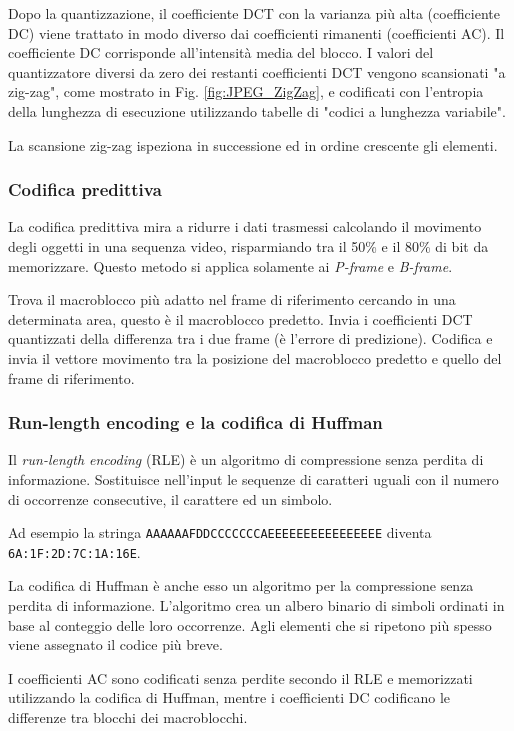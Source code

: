 Dopo la quantizzazione, il coefficiente DCT con la varianza più alta (coefficiente DC) viene trattato in modo diverso dai coefficienti rimanenti (coefficienti AC). Il coefficiente DC corrisponde all'intensità media del blocco. I valori del quantizzatore diversi da zero dei restanti coefficienti DCT vengono scansionati "a zig-zag", come mostrato in Fig. \ref{fig:JPEG_ZigZag}, e codificati con l'entropia della lunghezza di esecuzione utilizzando tabelle di "codici a lunghezza variabile".

La scansione zig-zag ispeziona in successione ed in ordine crescente gli elementi.



\subsubsection{Codifica predittiva}
La codifica predittiva mira a ridurre i dati trasmessi calcolando il movimento degli oggetti in una sequenza video, risparmiando tra il 50\% e il 80\% di bit da memorizzare. Questo metodo si applica solamente ai \textit{P-frame} e \textit{B-frame}.

Trova il macroblocco più adatto nel frame di riferimento cercando in una determinata area, questo è il macroblocco predetto.
Invia i coefficienti DCT quantizzati della differenza tra i due frame (è l'errore di predizione).
Codifica e invia il vettore movimento tra la posizione del macroblocco predetto e quello del frame di riferimento.



\subsubsection{Run-length encoding e la codifica di Huffman}
Il \textit{run-length encoding} (RLE) è un algoritmo di compressione senza perdita di informazione. Sostituisce nell'input le sequenze di caratteri uguali con il numero di occorrenze consecutive, il carattere ed un simbolo.

Ad esempio la stringa \verb|AAAAAAFDDCCCCCCCAEEEEEEEEEEEEEEEE| diventa \verb|6A:1F:2D:7C:1A:16E|.

La codifica di Huffman è anche esso un algoritmo per la compressione senza perdita di informazione. L'algoritmo crea un albero binario di simboli ordinati in base al conteggio delle loro occorrenze. Agli elementi che si ripetono più spesso viene assegnato il codice più breve.

I coefficienti AC sono codificati senza perdite secondo il RLE e memorizzati utilizzando la codifica di Huffman, mentre i coefficienti DC codificano le differenze tra blocchi dei macroblocchi.

